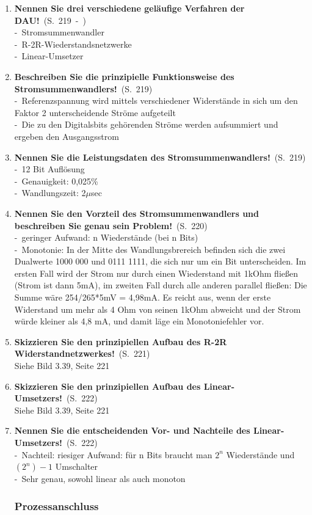 \documentclass[a4paper,12pt]{article}
\newcommand{\statement}[3]{\pagebreak[3]\item {\textbf{#1!}}\ (S.\ #2)#3}
\newcommand{\catchword}[1]{\\-\ #1}
\newcommand{\normaltext}[1]{\\#1}
\newcommand{\page}[1]{#1}
\newcommand{\pages}[2]{#1\ -\ #2}
\begin{document}
\begin{enumerate}
  \statement{Nennen Sie drei verschiedene geläufige Verfahren der DAU}{\pages{219}{}}
  {
    \catchword{Stromsummenwandler}
    \catchword{R-2R-Wiederstandsnetzwerke}
    \catchword{Linear-Umsetzer}
  }

  \statement{Beschreiben Sie die prinzipielle Funktionsweise des Stromsummenwandlers}{\page{219}}
  {
    \catchword{Referenzspannung wird mittels verschiedener Widerstände in sich um den Faktor 2
               unterscheidende Ströme aufgeteilt}
    \catchword{Die zu den Digitalsbits gehörenden Ströme werden aufsummiert und ergeben den Ausgangsstrom}
  }

  \statement{Nennen Sie die Leistungsdaten des Stromsummenwandlers}{\page{219}}
  {
    \catchword{12 Bit Auflösung}
    \catchword{Genauigkeit: 0,025\%}
    \catchword{Wandlungszeit: 2$\mu$sec}
  }

  \statement{Nennen Sie den Vorzteil des Stromsummenwandlers und beschreiben Sie
             genau sein Problem}{\page{220}}
  {
    \catchword{geringer Aufwand: n Wiederstände (bei n Bits)}
    \catchword{Monotonie: In der Mitte des Wandlungsbrereich befinden sich die zwei Dualwerte 1000 000
               und 0111 1111, die sich nur um ein Bit unterscheiden. Im ersten Fall wird der Strom nur
               durch einen Wiederstand mit 1kOhm fließen (Strom ist dann 5mA), im zweiten Fall durch alle
               anderen parallel fließen: Die Summe wäre 254/265*5mV = 4,98mA. Es reicht aus, wenn der erste
               Widerstand um mehr als 4 Ohm von seinen 1kOhm abweicht und der Strom würde kleiner als 4,8 mA,
               und damit läge ein Monotoniefehler vor.}
  }

  \statement{Skizzieren Sie den prinzipiellen Aufbau des R-2R Widerstandnetzwerkes}{\page{221}}
  {
    \normaltext{Siehe Bild 3.39, Seite 221}
  }

  \statement{Skizzieren Sie den prinzipiellen Aufbau des Linear-Umsetzers}{\page{222}}
  {
    \normaltext{Siehe Bild 3.39, Seite 221}
  }

  \statement{Nennen Sie die entscheidenden Vor- und Nachteile des Linear-Umsetzers}{\page{222}}
  {
    \catchword{Nachteil: riesiger Aufwand: für n Bits braucht man $2^n$ Wiederstände und $(2^n)-1$ Umschalter}
    \catchword{Sehr genau, sowohl linear als auch monoton}
  }

  \subsubsection{Prozessanschluss}


\end{enumerate}
\end{document}
